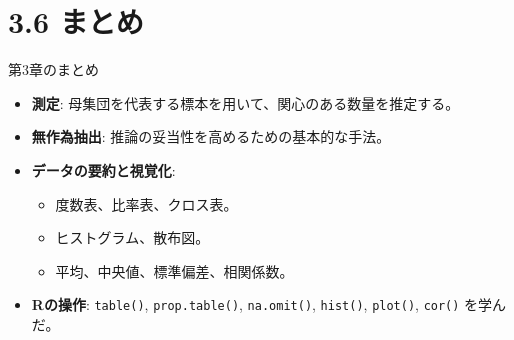 \documentclass[
  ignorenonframetext,
]{beamer}
\providecommand{\tightlist}{%
  \setlength{\itemsep}{0pt}\setlength{\parskip}{0pt}}
\begin{document}
\hypertarget{ux307eux3068ux3081}{%
\section{3.6 まとめ}\label{ux307eux3068ux3081}}

\begin{frame}[fragile]{第3章のまとめ}
\protect\hypertarget{ux7b2c3ux7ae0ux306eux307eux3068ux3081}{}
\begin{itemize}
\tightlist
\item
  \textbf{測定}:
  母集団を代表する標本を用いて、関心のある数量を推定する。
\item
  \textbf{無作為抽出}: 推論の妥当性を高めるための基本的な手法。
\item
  \textbf{データの要約と視覚化}:

  \begin{itemize}
  \tightlist
  \item
    度数表、比率表、クロス表。
  \item
    ヒストグラム、散布図。
  \item
    平均、中央値、標準偏差、相関係数。
  \end{itemize}
\item
  \textbf{Rの操作}: \texttt{table()}, \texttt{prop.table()},
  \texttt{na.omit()}, \texttt{hist()}, \texttt{plot()}, \texttt{cor()}
  を学んだ。
\end{itemize}
\end{frame}
\end{document}
